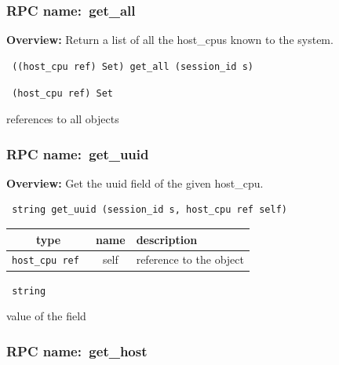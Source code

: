 \subsubsection{RPC name:~get\_all}

{\bf Overview:} 
Return a list of all the host\_cpus known to the system.

\begin{verbatim} ((host_cpu ref) Set) get_all (session_id s)\end{verbatim}


\vspace{0.3cm}

{\tt 
(host\_cpu ref) Set
}


references to all objects
\vspace{0.3cm}
\vspace{0.3cm}
\vspace{0.3cm}
\subsubsection{RPC name:~get\_uuid}

{\bf Overview:} 
Get the uuid field of the given host\_cpu.

\begin{verbatim} string get_uuid (session_id s, host_cpu ref self)\end{verbatim}



 
\vspace{0.3cm}
\begin{tabular}{|c|c|p{7cm}|}
 \hline
{\bf type} & {\bf name} & {\bf description} \\ \hline
{\tt host\_cpu ref } & self & reference to the object \\ \hline 

\end{tabular}

\vspace{0.3cm}

{\tt 
string
}


value of the field
\vspace{0.3cm}
\vspace{0.3cm}
\vspace{0.3cm}
\subsubsection{RPC name:~get\_host}

